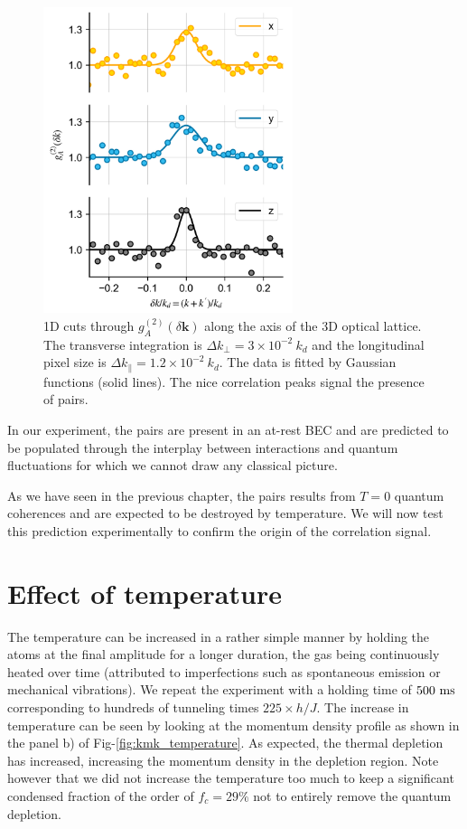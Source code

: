 \begin{figure}
    \centering
    \includegraphics[width=0.65\textwidth]{Fig/Chapter4/1d_cuts.png}
    \caption{1D cuts through $g_{A}^{(2)} (\delta {\bm k})$ along the axis of the 3D optical lattice. The transverse integration is $\Delta k_{\perp}=3 \times 10^{-2} \ k_d$ and the longitudinal pixel size is $\Delta k_{\parallel}=1.2 \times 10^{-2} \ k_d$. The data is fitted by Gaussian functions (solid lines). The nice correlation peaks signal the presence of \kmk pairs.}
    \label{fig:kmk_signal}
\end{figure}

In our experiment, the \kmk pairs are present in an at-rest BEC and are predicted to be populated through the interplay between interactions and quantum fluctuations for which we cannot draw any classical picture.

As we have seen in the previous chapter, the \kmk pairs results from $T=0$ quantum coherences and are expected to be destroyed by temperature. We will now test this prediction experimentally to confirm the origin of the correlation signal.

\section{Effect of temperature}

The temperature can be increased in a rather simple manner by holding the atoms at the final amplitude for a longer duration, the gas being continuously heated over time (attributed to imperfections such as spontaneous emission or mechanical vibrations). We repeat the experiment with a holding time of $500 \ \rm{ms}$ corresponding to hundreds of tunneling times $225 \times h/J$. The increase in temperature can be seen by looking at the momentum density profile as shown in the panel b) of Fig-\ref{fig:kmk_temperature}. As expected, the thermal depletion has increased, increasing the momentum density in the depletion region. Note however that we did not increase the temperature too much to keep a significant condensed fraction of the order of $f_c = 29 \%$ not to entirely remove the quantum depletion.

